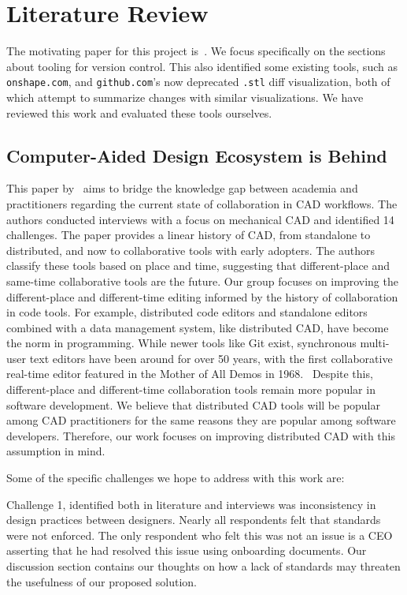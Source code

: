 \documentclass[sigconf,authorversion,nonacm]{acmart}
\begin{document}
\section{Literature Review}

The motivating paper for this project is~\citet{cheng2023age}.
We focus specifically on the sections about tooling for version control.
This also identified some existing tools, such as \texttt{onshape.com}, and \texttt{github.com}'s now deprecated \texttt{.stl} diff visualization, both of which attempt to summarize changes with similar visualizations.
We have reviewed this work and evaluated these tools ourselves.

\subsection{Computer-Aided Design Ecosystem is Behind}

This paper by~\citet{cheng2023age} aims to bridge the knowledge gap between academia and practitioners regarding the current state of collaboration in CAD workflows. 
The authors conducted interviews with a focus on mechanical CAD and identified 14 challenges. The paper provides a linear history of CAD, from standalone to distributed, and now to collaborative tools with early adopters. 
The authors classify these tools based on place and time, suggesting that different-place and same-time collaborative tools are the future.
Our group focuses on improving the different-place and different-time editing informed by the history of collaboration in code tools.
For example, distributed code editors and standalone editors combined with a data management system, like distributed CAD, have become the norm in programming. 
While newer tools like Git exist, synchronous multi-user text editors have been around for over 50 years, with the first collaborative real-time editor featured in the Mother of All Demos in 1968.~\cite{motherofalldemos}
Despite this, different-place and different-time collaboration tools remain more popular in software development.
We believe that distributed CAD tools will be popular among CAD practitioners for the same reasons they are popular among software developers. Therefore, our work focuses on improving distributed CAD with this assumption in mind.

Some of the specific challenges we hope to address with this work are:

Challenge 1, identified both in literature and interviews was inconsistency in design practices between designers.
Nearly all respondents felt that standards were not enforced.
The only respondent who felt this was not an issue is a CEO asserting that he had resolved this issue using onboarding documents.
Our discussion section contains our thoughts on how a lack of standards may threaten the usefulness of our proposed solution.
\end{document}
